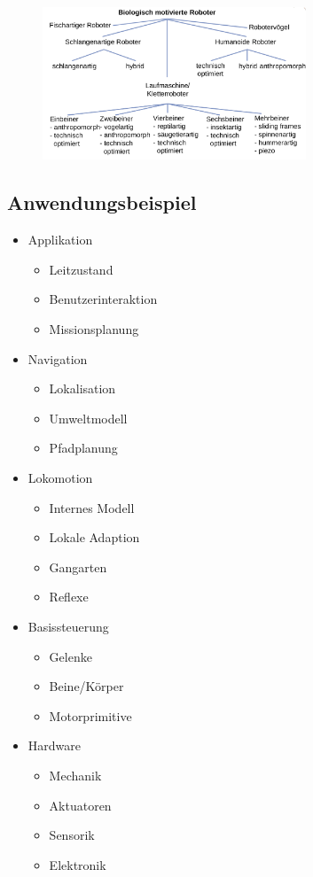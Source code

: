 \begin{figure}
	\centering
	\includegraphics[width=0.7\textwidth]{figures/einordnung.png}
\end{figure}

\subsection{Anwendungsbeispiel}
\begin{itemize}
	\item Applikation
	\begin{itemize}
		\item Leitzustand
		\item Benutzerinteraktion
		\item Missionsplanung
	\end{itemize}
	\item Navigation
	\begin{itemize}
		\item Lokalisation
		\item Umweltmodell
		\item Pfadplanung
	\end{itemize}
	\item Lokomotion
	\begin{itemize}
		\item Internes Modell
		\item Lokale Adaption
		\item Gangarten
		\item Reflexe
	\end{itemize}
	\item Basissteuerung
	\begin{itemize}
		\item Gelenke
		\item Beine/Körper
		\item Motorprimitive
	\end{itemize}
	\item Hardware
	\begin{itemize}
		\item Mechanik
		\item Aktuatoren
		\item Sensorik
		\item Elektronik
	\end{itemize}
\end{itemize}


